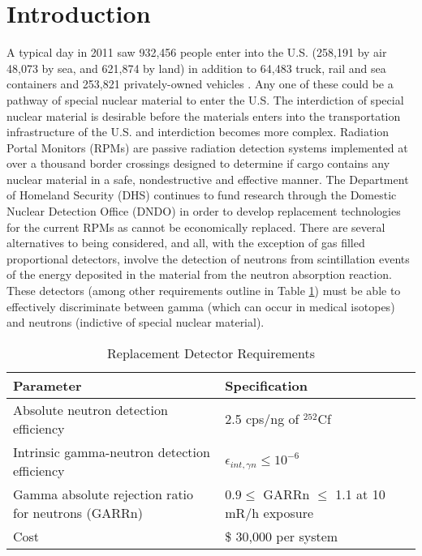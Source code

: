 \section{Introduction}

A typical day in 2011 saw 932,456 people enter into the U.S. (258,191 by air 48,073 by sea, and 621,874 by land) in addition to 64,483 truck, rail and sea containers and 253,821 privately-owned vehicles \cite{cpb_typical_2012}.
Any one of these could be a pathway of special nuclear material to enter the U.S.
The interdiction of special nuclear material is desirable before the materials enters into the transportation infrastructure of the U.S. and interdiction becomes more complex.
Radiation Portal Monitors (RPMs) are passive radiation detection systems implemented at over a thousand border crossings designed to determine if cargo contains any nuclear material in a safe, nondestructive and effective manner\cite{kouzes_neutron_2010}.
The Department of Homeland Security (DHS) continues to fund research through the Domestic Nuclear Detection Office (DNDO) in order to develop replacement technologies for the current  RPMs as  cannot be economically replaced.
There are several alternatives to  being considered, and all, with the exception of gas filled proportional detectors, involve the detection of neutrons from scintillation events of the energy deposited in the material from the neutron absorption reaction.
These detectors (among other requirements outline in Table \ref{tab:DHSCriteria}) must be able to effectively discriminate between gamma (which can occur in medical isotopes) and neutrons (indictive of special nuclear material).
\begin{table}[h]
    \caption{Replacement Detector Requirements \protect\cite{kouzes_neutron_1999}}
	\centering
	\begin{tabular}{p{} | p{} }
	Parameter & Specification \\
	\hline
	\hline
	Absolute neutron detection efficiency & 2.5 cps/ng of ${}^{252}$Cf \\
	Intrinsic gamma-neutron detection efficiency & $ \epsilon_{int,\gamma n}\leq 10^{-6}$ \\
	Gamma absolute rejection ratio for neutrons (GARRn) & $ 0.9 \leq \text{ GARRn }\leq$ 1.1 at 10 mR/h exposure \\
	Cost &  \$ 30,000 per system \\
	\hline
	\end{tabular}
    \label{tab:DHSCriteria}
\end{table}

